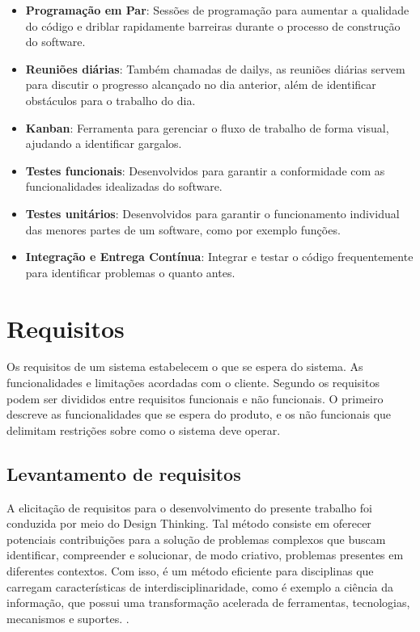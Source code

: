 \begin{itemize}
    \item \textbf{Programação em Par}: Sessões de programação para aumentar a qualidade do código e driblar rapidamente barreiras durante o processo de construção do software.
    \item \textbf{Reuniões diárias}: Também chamadas de dailys, as reuniões diárias servem para discutir o progresso alcançado no dia anterior, além de identificar obstáculos para o trabalho do dia.
    \item \textbf{Kanban}: Ferramenta para gerenciar o fluxo de trabalho de forma visual, ajudando a identificar gargalos.
    \item \textbf{Testes funcionais}: Desenvolvidos para garantir a conformidade com as funcionalidades idealizadas do software.
    \item \textbf{Testes unitários}: Desenvolvidos para garantir o funcionamento individual das menores partes de um software, como por exemplo funções.
    \item \textbf{Integração e Entrega Contínua}: Integrar e testar o código frequentemente para identificar problemas o quanto antes.
\end{itemize}

\section{Requisitos}
Os requisitos de um sistema estabelecem o que se espera do sistema. As funcionalidades e limitações acordadas com o cliente. Segundo \cite{sommerville2011} os requisitos podem ser divididos entre requisitos funcionais e não funcionais. O primeiro descreve as funcionalidades que se espera do produto, e os não funcionais que delimitam restrições sobre como o sistema deve operar.

\subsection{Levantamento de requisitos}
A elicitação de requisitos para o desenvolvimento do presente trabalho foi conduzida por meio do Design Thinking. Tal método consiste em oferecer potenciais contribuições para a solução de problemas complexos que buscam identificar, compreender e solucionar, de modo criativo, problemas presentes em diferentes contextos. Com isso, é um método eficiente para disciplinas que carregam características de interdisciplinaridade, como é exemplo a ciência da informação, que possui uma transformação acelerada de ferramentas, tecnologias, mecanismos e suportes. \cite{apocalypse2022}.

